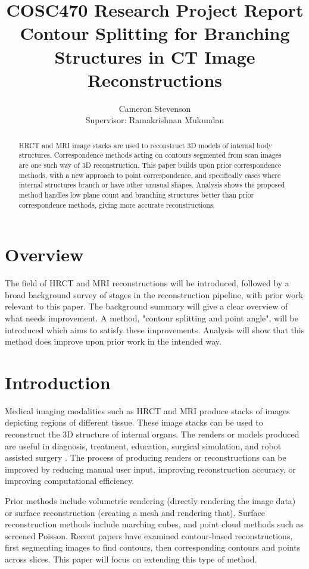 \documentclass[11p, titlepage]{article}
\title{COSC470 Research Project Report\\
\bigskip
Contour Splitting for Branching Structures in CT Image Reconstructions}
\author{Cameron Stevenson\\[0.5cm]{\small Supervisor: Ramakrishnan Mukundan}}
\begin{document}
\maketitle
\begin{abstract}
HRCT and MRI image stacks are used to reconstruct 3D models of internal body structures. Correspondence methods acting on contours segmented from scan images are one such way of 3D reconstruction. This paper builds upon prior correspondence methods, with a new approach to point correspondence, and specifically cases where internal structures branch or have other unusual shapes. Analysis shows the proposed method handles low plane count and branching structures better than prior correspondence methods, giving more accurate reconstructions.
\end{abstract}
\tableofcontents

\section{Overview}

The field of HRCT and MRI reconstructions will be introduced, followed by a broad background survey of stages in the reconstruction pipeline, with prior work relevant to this paper. The background summary will give a clear overview of what needs improvement. A method, "contour splitting and point angle", will be introduced which aims to satisfy these improvements. Analysis will show that this method does improve upon prior work in the intended way.

\pagebreak

\section{Introduction}

Medical imaging modalities such as HRCT and MRI produce stacks of images depicting regions of different tissue. These image stacks can be used to reconstruct the 3D structure of internal organs. The renders or models produced are useful in diagnosis, treatment, education, surgical simulation, and robot assisted surgery \cite{mackay2019robust, mukundan2016reconstruction, pan2017comparison}. The process of producing renders or reconstructions can be improved by reducing manual user input, improving reconstruction accuracy, or improving computational efficiency.

Prior methods include volumetric rendering (directly rendering the image data) or surface reconstruction (creating a mesh and rendering that). Surface reconstruction methods include marching cubes, and point cloud methods such as screened Poisson. Recent papers \cite{mackay2019robust, mukundan2016reconstruction} have examined contour-based reconstructions, first segmenting images to find contours, then corresponding contours and points across slices. This paper will focus on extending this type of method.
\end{document}
